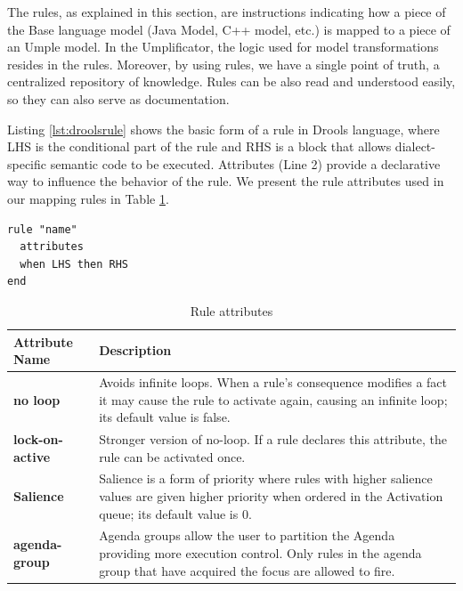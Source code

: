 The rules, as explained in this section, are instructions indicating how a piece of the Base language model (Java Model, C++ model, etc.) is mapped to a piece of an Umple model. In the Umplificator, the logic used for model transformations resides in the rules. Moreover, by using rules, we have a single point of truth, a centralized repository of knowledge. Rules can be also read and understood easily, so they can also serve as documentation.

Listing \ref{lst:droolsrule} shows the basic form of a rule in Drools language, where LHS is the conditional part of the rule and RHS is a block that allows dialect-specific semantic code to be executed.  Attributes (Line 2) provide a declarative way to influence the behavior of the rule. We present the rule attributes used in our mapping rules in Table \ref{table:ruleattributes}.

\begin{lstlisting}[language={drools},label={lst:droolsrule}, caption=Basic rule in Drools] 
rule "name" 
  attributes 
  when LHS then RHS
end
\end{lstlisting}

\begin{table}[h]
\caption{Rule attributes}
\centering
\label{table:ruleattributes}
\begin{tabular}{l|p{9cm}}
\toprule
\rowcolor[HTML]{BBDAFF}
\textbf{Attribute Name} & \textbf{Description}   \\ \midrule
\textbf{no loop} & Avoids infinite loops. When a rule's consequence modifies a fact it may cause the rule to activate again, causing an infinite loop; its default value is false.\\ \hline
\textbf{lock-on-active} &  Stronger version of no-loop. If a rule declares this attribute, the rule can be activated once.   \\ \hline
\textbf{Salience} & Salience is a form of priority where rules with higher salience values are given higher priority when ordered in the Activation queue; its default value is 0. \\ \hline
\textbf{agenda-group} & Agenda groups allow the user to partition the Agenda providing more execution control. Only rules in the agenda group that have acquired the focus are allowed to fire.     \\ \bottomrule
\end{tabular}
\end{table}

